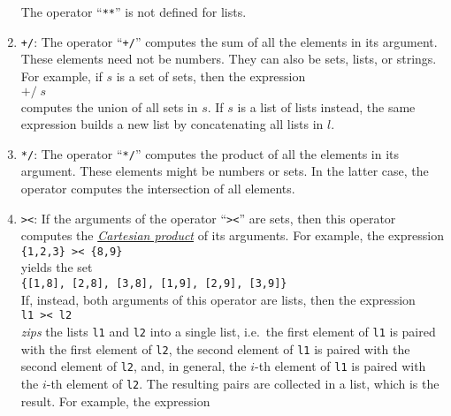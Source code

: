 \begin{enumerate}
      The operator ``\texttt{**}'' is not defined for lists.
\item \texttt{+/}:  The operator ``\texttt{+/}'' computes the sum of all the elements
      in its argument.  These elements need not be numbers.  They can also be sets, lists,
      or strings.  For example, if $s$ is a set of sets, then the expression 
      \\[0.2cm]
      \hspace*{1.3cm}
      $\texttt{+/}\;s$
      \\[0.2cm]
      computes the union of all sets in $s$.  If $s$ is a list of lists instead, the same
      expression builds a new list by concatenating all lists in $l$.
\item \texttt{*/}:  The operator ``\texttt{*/}'' computes the product of all the elements
      in its argument.  These elements might be  numbers or sets.  In the latter case,
      the operator computes the intersection of all elements.
\item \texttt{><}: If the arguments of the operator ``\texttt{><}'' are sets, then this operator computes the 
      \href{https://en.wikipedia.org/wiki/Cartesian_product}{\emph{Cartesian product}}
      of its arguments.  For example, the expression
      \\[0.2cm]
      \hspace*{1.3cm}
      \texttt{\{1,2,3\} >< \{8,9\}}
      \\[0.2cm]
      yields the set
      \\[0.2cm]
      \hspace*{1.3cm}
      \texttt{\{[1,8], [2,8], [3,8], [1,9], [2,9], [3,9]\}}
      \\[0.2cm]
      If, instead, both arguments of this operator are lists, then the expression 
      \\[0.2cm]
      \hspace*{1.3cm}
      \texttt{l1 >< l2}
      \\[0.2cm]
      \emph{zips} the lists \texttt{l1} and \texttt{l2} into a single list, i.e.~the first element
      of \texttt{l1} is paired with the first element of \texttt{l2}, the second element of
      \texttt{l1} is paired with the second element of \texttt{l2}, and, in general, the
      $i$-th element of \texttt{l1} is paired with the $i$-th element of \texttt{l2}. 
      The resulting pairs are collected in a list, which is the result.
      For example, the expression
      \\[0.2cm]
      \hspace*{1.3cm}

\end{enumerate}
